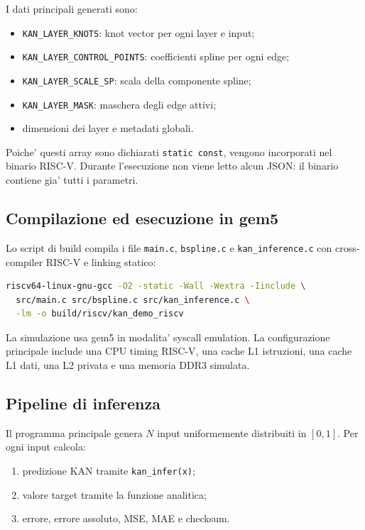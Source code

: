 \documentclass[conference]{IEEEtran}
\begin{document}
I dati principali generati sono:
\begin{itemize}
    \item \texttt{KAN\_LAYER\_KNOTS}: knot vector per ogni layer e input;
    \item \texttt{KAN\_LAYER\_CONTROL\_POINTS}: coefficienti spline per ogni edge;
    \item \texttt{KAN\_LAYER\_SCALE\_SP}: scala della componente spline;
    \item \texttt{KAN\_LAYER\_MASK}: maschera degli edge attivi;
    \item dimensioni dei layer e metadati globali.
\end{itemize}

Poiche' questi array sono dichiarati \texttt{static const}, vengono incorporati nel binario RISC-V. Durante l'esecuzione non viene letto alcun JSON: il binario contiene gia' tutti i parametri.

\subsection{Compilazione ed esecuzione in gem5}
Lo script di build compila i file \texttt{main.c}, \texttt{bspline.c} e \texttt{kan\_inference.c} con cross-compiler RISC-V e linking statico:
\begin{lstlisting}[language=bash]
riscv64-linux-gnu-gcc -O2 -static -Wall -Wextra -Iinclude \
  src/main.c src/bspline.c src/kan_inference.c \
  -lm -o build/riscv/kan_demo_riscv
\end{lstlisting}

La simulazione usa gem5 in modalita' syscall emulation. La configurazione principale include una CPU timing RISC-V, una cache L1 istruzioni, una cache L1 dati, una L2 privata e una memoria DDR3 simulata.

\subsection{Pipeline di inferenza}
Il programma principale genera $N$ input uniformemente distribuiti in $[0,1]$. Per ogni input calcola:
\begin{enumerate}
    \item predizione KAN tramite \texttt{kan\_infer(x)};
    \item valore target tramite la funzione analitica;
    \item errore, errore assoluto, MSE, MAE e checksum.
\end{enumerate}
\end{document}
